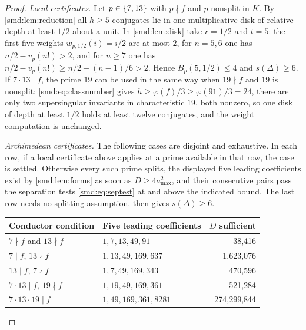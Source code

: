 \begin{proof}
\emph{Local certificates.} Let $p\in\{7,13\}$ with $p\nmid f$ and $p$ nonsplit in $K$.
By \cref{smd:lem:reduction} all $h\ge5$ conjugates lie in one multiplicative disk of
relative depth at least $1/2$ about a unit. In \cref{smd:lem:disk} take $r=1/2$ and
$t=5$: the first five weights $w_{p,1/2}(i)=i/2$ are at most $2$, for $n=5,6$ one has
$n/2-v_p(n!)>2$, and for $n\ge7$ one has $n/2-v_p(n!)\ge n/2-(n-1)/6>2$. Hence
$B_p(5,1/2)\le4$ and $s(\Delta)\ge6$. If $7\cdot13\mid f$, the prime $19$ can be used in
the same way when $19\nmid f$ and $19$ is nonsplit: \eqref{smd:eq:classnumber} gives
$h\ge\varphi(f)/3\ge\varphi(91)/3=24$, there are only two supersingular invariants in
characteristic $19$, both nonzero, so one disk of depth at least $1/2$ holds at least
twelve conjugates, and the weight computation is unchanged.

\emph{Archimedean certificates.} The following cases are disjoint and exhaustive. In each
row, if a local certificate above applies at a prime available in that row, the case is
settled. Otherwise every such prime splits, the displayed five leading coefficients exist
by \cref{smd:lem:forms} as soon as $D\ge4a_{\max}^2$, and their consecutive pairs pass the
separation tests \eqref{smd:eq:septest} at and above the indicated bound. The last row
needs no splitting assumption.  then gives $s(\Delta)\ge6$.
\begin{center}
\begin{tabular}{llr}
\toprule
Conductor condition & Five leading coefficients & $D$ sufficient\\
\midrule
$7\nmid f$ and $13\nmid f$ & $1,7,13,49,91$ & 38,416\\
$7\mid f$, $13\nmid f$ & $1,13,49,169,637$ & 1,623,076\\
$13\mid f$, $7\nmid f$ & $1,7,49,169,343$ & 470,596\\
$7\cdot13\mid f$, $19\nmid f$ & $1,19,49,169,361$ & 521,284\\
$7\cdot13\cdot19\mid f$ & $1,49,169,361,8281$ & 274,299,844\\
\bottomrule
\end{tabular}
\end{center}


\end{proof}

